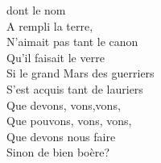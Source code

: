 
 dont le nom
\\A rempli la terre,
\\N'aimait pas tant le canon
\\Qu'il faisait le verre
\\Si le grand Mars des guerriers
\\S'est acquis tant de lauriers
\\Que devons, vons,vons,
\\Que pouvons, vons, vons,
\\Que devons nous faire
\\Sinon de bien boère?
